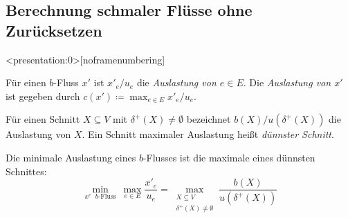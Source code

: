 \subsection{Berechnung schmaler Flüsse ohne Zurücksetzen}

\begin{frame}<presentation:0>[noframenumbering]
	\begin{definition}
		Für einen $b$-Fluss $x'$ ist $x'_e/u_e$ die \emph{Auslastung von $e\in E$}.
		Die \emph{Auslastung von $x'$} ist gegeben durch $c(x')\coloneq \max_{e\in E} x'_e / u_e$.	
	\end{definition}
	\pause\begin{definition}
	Für einen Schnitt $X\subseteq V$ mit $\delta^+(X)\neq \emptyset$ bezeichnet $b(X) / u(\delta^+(X))$ die Auslastung von $X$.
	Ein Schnitt maximaler Auslastung heißt \emph{dünnster Schnitt}.
	\end{definition}
	\pause\begin{theorem}
		Die minimale Auslastung eines $b$-Flusses ist die maximale eines dünnsten Schnittes:
		\[
		\min_{\text{$x'$ $b$-Fluss}}~ \max_{e\in E} \frac{x'_e}{u_e} = \max_{\substack{X\subseteq V\\ \delta^+(X) \neq \emptyset}} \frac{b(X)}{u(\delta^+(X))}
		\]
	\end{theorem}
\end{frame}



